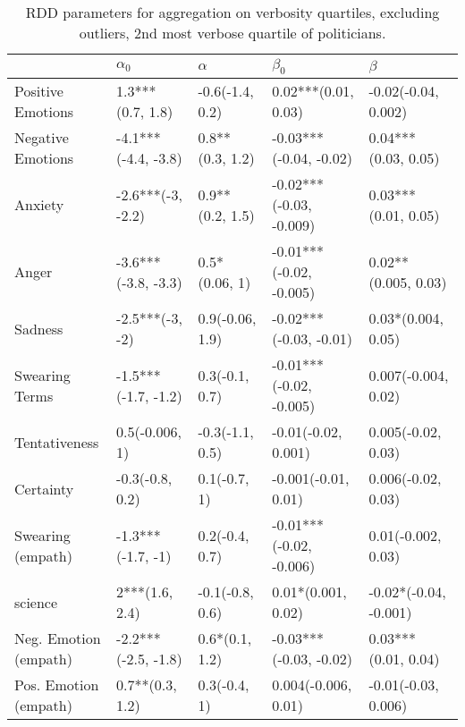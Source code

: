 \begin{table}[h]\centering
\caption{RDD parameters for aggregation on verbosity quartiles, excluding outliers, 2nd most verbose quartile of politicians.}
	\label{fig: Verbosity_4}
\begin{adjustbox}{width=\linewidth, center}
	\begin{tabular}{lllll}
	\toprule
	{} &           $\alpha_0$ &         $\alpha$ &                $\beta_0$ &                $\beta$ \\
	\midrule
	Positive Emotions     &     1.3***(0.7, 1.8) &  -0.6(-1.4, 0.2) &      0.02***(0.01, 0.03) &    -0.02(-0.04, 0.002) \\
	Negative Emotions     &  -4.1***(-4.4, -3.8) &  0.8**(0.3, 1.2) &   -0.03***(-0.04, -0.02) &    0.04***(0.03, 0.05) \\
	Anxiety               &    -2.6***(-3, -2.2) &  0.9**(0.2, 1.5) &  -0.02***(-0.03, -0.009) &    0.03***(0.01, 0.05) \\
	Anger                 &  -3.6***(-3.8, -3.3) &    0.5*(0.06, 1) &  -0.01***(-0.02, -0.005) &    0.02**(0.005, 0.03) \\
	Sadness               &      -2.5***(-3, -2) &  0.9(-0.06, 1.9) &   -0.02***(-0.03, -0.01) &     0.03*(0.004, 0.05) \\
	Swearing Terms        &  -1.5***(-1.7, -1.2) &   0.3(-0.1, 0.7) &  -0.01***(-0.02, -0.005) &    0.007(-0.004, 0.02) \\
	Tentativeness         &       0.5(-0.006, 1) &  -0.3(-1.1, 0.5) &      -0.01(-0.02, 0.001) &     0.005(-0.02, 0.03) \\
	Certainty             &      -0.3(-0.8, 0.2) &     0.1(-0.7, 1) &      -0.001(-0.01, 0.01) &     0.006(-0.02, 0.03) \\
	Swearing (empath)     &    -1.3***(-1.7, -1) &   0.2(-0.4, 0.7) &  -0.01***(-0.02, -0.006) &     0.01(-0.002, 0.03) \\
	science               &       2***(1.6, 2.4) &  -0.1(-0.8, 0.6) &       0.01*(0.001, 0.02) &  -0.02*(-0.04, -0.001) \\
	Neg. Emotion (empath) &  -2.2***(-2.5, -1.8) &   0.6*(0.1, 1.2) &   -0.03***(-0.03, -0.02) &    0.03***(0.01, 0.04) \\
	Pos. Emotion (empath) &      0.7**(0.3, 1.2) &     0.3(-0.4, 1) &      0.004(-0.006, 0.01) &    -0.01(-0.03, 0.006) \\
	\bottomrule
	\end{tabular}
	
\end{adjustbox}
	\end{table}

